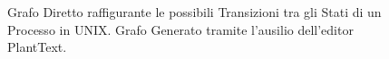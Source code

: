 \begin{figure}[H]
    \centering
    
    \label{fig:TransizioniStatiUnix}
    \caption[Transizioni tra gli Stati di un Processo in UNIX]{Grafo Diretto raffigurante le possibili Transizioni tra gli Stati di un Processo in UNIX. Grafo Generato tramite l'ausilio dell'editor PlantText\cite{PlantText}.}
\end{figure}